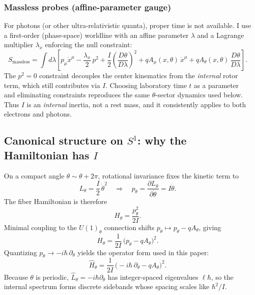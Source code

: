 \subsubsection{Massless probes (affine-parameter gauge)}
For photons (or other ultra-relativistic quanta), proper time is not available. I use a
first-order (phase-space) worldline with an affine parameter $\lambda$ and a Lagrange
multiplier $\lambda_x$ enforcing the null constraint:
\begin{equation}
S_\text{massless}=\int d\lambda\left[
 p_\mu \dot x^\mu - \frac{\lambda_x}{2}\,p^2
 + \frac{I}{2}\left(\frac{D\theta}{D\lambda}\right)^2
 + q A_\mu(x,\theta)\,\dot x^\mu
 + q A_\theta(x,\theta)\,\frac{D\theta}{D\lambda}
\right].
\label{eq:Smassless}
\end{equation}
The $p^2=0$ constraint decouples the center kinematics from the \emph{internal} rotor term,
which still contributes via $I$. Choosing laboratory time $t$ as a parameter and eliminating
constraints reproduces the same $\theta$-sector dynamics used below. Thus $I$ is an \emph{internal}
inertia, not a rest mass, and it consistently applies to both electrons and photons.

\subsection{\texorpdfstring{Canonical structure on $S^1$: why the Hamiltonian has $I$}{Canonical structure on S\^1: why the Hamiltonian has I}}
On a compact angle $\theta\sim\theta+2\pi$, rotational invariance fixes the kinetic term to
\begin{equation}
L_\theta=\frac{I}{2}\,\dot\theta^2 \quad\Longrightarrow\quad p_\theta=\frac{\partial L_\theta}{\partial \dot\theta}=I\dot\theta.
\end{equation}
The fiber Hamiltonian is therefore
\begin{equation}
H_\theta=\frac{p_\theta^2}{2I}.
\end{equation}
Minimal coupling to the $U(1)_\theta$ connection shifts $p_\theta\mapsto p_\theta-qA_\theta$, giving
\begin{equation}
H_\theta=\frac{1}{2I}\,\big(p_\theta-qA_\theta\big)^2.
\end{equation}
Quantizing $p_\theta\to -i\hbar\,\partial_\theta$ yields the operator form used in this paper:
\begin{equation}
\hat H_\theta=\frac{1}{2I}\,\big(-i\hbar\,\partial_\theta-qA_\theta\big)^2.
\label{eq:Htheta_op}
\end{equation}
Because $\theta$ is periodic, $\hat L_\theta=-i\hbar\partial_\theta$ has integer-spaced eigenvalues $\ell\hbar$,
so the internal spectrum forms discrete sidebands whose spacing scales like $\hbar^2/I$.


